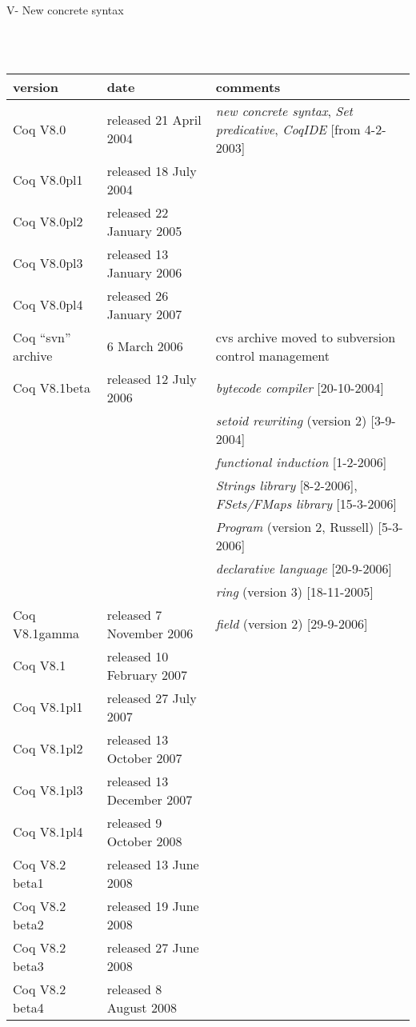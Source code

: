 \documentclass[a4paper]{book}
\newcommand{\feature}[1]{{\em #1}}
\begin{document}
\centerline{V- New concrete syntax}
\mbox{}\\
\mbox{}\\
\begin{tabular}{l|l|l}
version & date & comments \\
\hline
Coq V8.0& released 21 April 2004 & \feature{new concrete syntax}, \feature{Set predicative}, \feature{CoqIDE} [from 4-2-2003]\\

Coq V8.0pl1& released 18 July 2004\\

Coq V8.0pl2& released 22 January 2005\\

Coq V8.0pl3& released 13 January 2006\\

Coq V8.0pl4& released 26 January 2007\\

Coq ``svn'' archive & 6 March 2006 & cvs archive moved to subversion control management\\

Coq V8.1beta& released 12 July 2006 & \feature{bytecode compiler} [20-10-2004] \\
  & & \feature{setoid rewriting} (version 2) [3-9-2004]\\
  & & \feature{functional induction} [1-2-2006]\\
  & & \feature{Strings library} [8-2-2006], \feature{FSets/FMaps library} [15-3-2006] \\
  & & \feature{Program} (version 2, Russell) [5-3-2006] \\
  & & \feature{declarative language} [20-9-2006]\\
  & & \feature{ring} (version 3) [18-11-2005]\\

Coq V8.1gamma& released 7 November 2006 & \feature{field} (version 2) [29-9-2006]\\

Coq V8.1& released 10 February 2007 & \\

Coq V8.1pl1& released 27 July 2007 & \\
Coq V8.1pl2& released 13 October 2007 & \\
Coq V8.1pl3& released 13 December 2007 & \\
Coq V8.1pl4& released 9 October 2008 & \\

Coq V8.2 beta1& released 13 June 2008 & \\
Coq V8.2 beta2& released 19 June 2008 & \\
Coq V8.2 beta3& released 27 June 2008 & \\
Coq V8.2 beta4& released 8 August 2008 & \\


\end{tabular}
\end{document}
